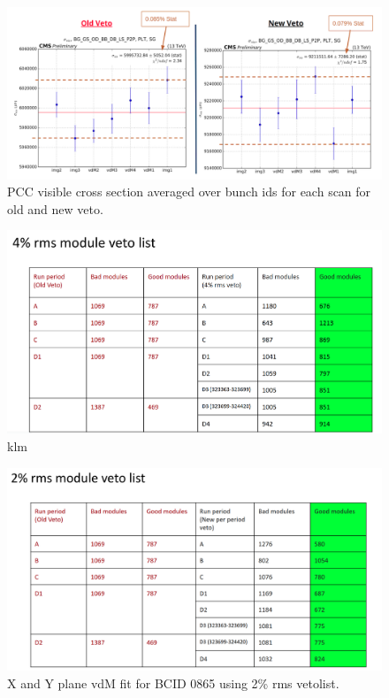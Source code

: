 \begin{figure}[!htp]
\centering
\includegraphics[width=1\textwidth]{ashish_thesis/sigmavis_old_new_veto.png}
\caption{%
   PCC visible cross section averaged over bunch ids for each scan for old and new veto.
}
\label{fig:old_new_veto_sigmavis}
\end{figure}


\begin{figure}[!htp]
\centering
\includegraphics[width=1\textwidth]{ashish_thesis/4per_rms_veto.png}
\caption{%
   klm
}
\label{fig:4per_veto}
\end{figure}


\begin{figure}[!htp]
\centering
\includegraphics[width=1\textwidth]{ashish_thesis/2per_rms_veto.png}
\caption{%
   X and Y plane vdM fit for BCID 0865 using 2\% rms  vetolist.
}
\label{fig:2per_veto}
\end{figure}


